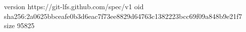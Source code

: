 version https://git-lfs.github.com/spec/v1
oid sha256:2a0625bbceafe0b3d6eac7f73ee8829d64763c1382223bcc69f09a848b9e21f7
size 95825

